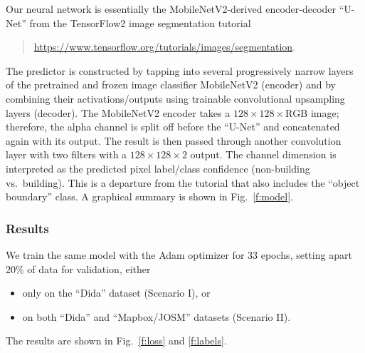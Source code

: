 \documentclass[12pt,a4paper]{article}
\begin{document}
    Our neural network
    is essentially 
    the MobileNetV2-derived
    encoder-decoder ``U-Net''
    from the TensorFlow2 image segmentation tutorial
    \begin{quote}
        \href{https://www.tensorflow.org/tutorials/images/segmentation}{https://www.tensorflow.org/tutorials/images/segmentation}.
    \end{quote}
    The predictor is 
    constructed 
    by tapping into several 
    progressively narrow layers 
    of the pretrained and frozen
    image classifier MobileNetV2 (encoder)
    and
    by combining their activations/outputs using 
    trainable 
    convolutional
    upsampling layers (decoder).
    The MobileNetV2 encoder 
    takes a $128 \times 128 \times \text{RGB}$ image;
    therefore,
    the alpha channel is split off
    before the ``U-Net''
    and 
    concatenated again with its output.
    The result is then passed through another
    convolution layer with two filters
    with a $128 \times 128 \times 2$ output.
    The channel dimension is 
    interpreted as the predicted pixel label/class confidence
    (non-building vs.~building).
    This is a departure from the tutorial
    that also includes the ``object boundary'' class.
    A graphical summary is shown in Fig.~\ref{f:model}.
    
    
    

    \subsubsection*{Results}
    
    We train the same model with the Adam optimizer for 33 epochs,
    setting apart 20\% of data for validation,
    either 
    \begin{itemize}
    \item 
        only on the ``Dida'' dataset (Scenario I), or
    \item
        on both ``Dida'' and ``Mapbox/JOSM'' datasets (Scenario II).
    \end{itemize}
    
    The results are shown in Fig.~\ref{f:loss} and \ref{f:labels}.
    
\end{document}
